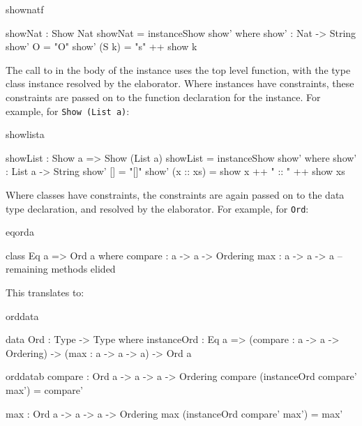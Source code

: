 \begin{SaveVerbatim}{shownatf}

showNat : Show Nat
showNat = instanceShow show' where
    show' : Nat -> String
    show' O = "O"
    show' (S k) = "s" ++ show k

\end{SaveVerbatim}

The call to  in the body of the instance uses the top level 
function, with the type class instance resolved by the elaborator.
Where instances have constraints, these constraints are passed on to
the function declaration for the instance. For example, for \texttt{Show (List a)}:

\begin{SaveVerbatim}{showlista}

showList : Show a => Show (List a)
showList = instanceShow show' where
    show' : List a -> String
    show' []        = "[]"
    show' (x :: xs) = show x ++ " :: " ++ show xs

\end{SaveVerbatim}

\noindent
Where classes have constraints, the
constraints are again passed on to the data type declaration, and resolved by the
elaborator. For example, for \texttt{Ord}:

\begin{SaveVerbatim}{eqorda}

class Eq a => Ord a where
    compare : a -> a -> Ordering
    max : a -> a -> a
    -- remaining methods elided

\end{SaveVerbatim}

\noindent
This translates to:

\begin{SaveVerbatim}{orddata}

data Ord : Type -> Type where
    instanceOrd : Eq a => (compare : a -> a -> Ordering) -> 
                          (max : a -> a -> a) ->  Ord a 

\end{SaveVerbatim}

\begin{SaveVerbatim}{orddatab}
compare : Ord a -> a -> a -> Ordering
compare (instanceOrd compare' max') = compare'

max : Ord a -> a -> a -> Ordering
max (instanceOrd compare' max') = max'

\end{SaveVerbatim}

